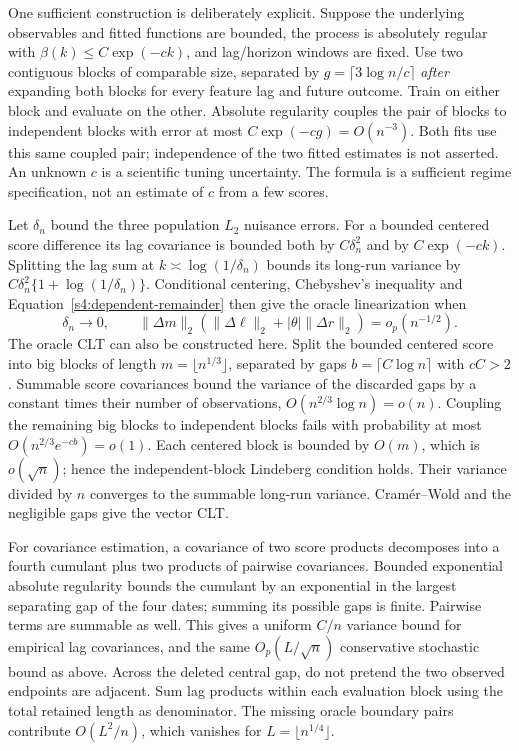 One sufficient construction is deliberately explicit. Suppose the underlying
observables and fitted functions are bounded, the process is absolutely
regular with $\beta(k)\le C\exp(-ck)$, and lag/horizon windows are fixed.
Use two contiguous blocks of comparable size, separated by
$g=\lceil3\log n/c\rceil$ \emph{after} expanding both blocks for every
feature lag and future outcome. Train on either block and evaluate on the
other. Absolute regularity couples the pair of blocks to independent
blocks with error at most $C\exp(-cg)=O(n^{-3})$. Both fits use this
same coupled pair; independence of the two fitted estimates is not asserted.
An unknown $c$ is a scientific tuning uncertainty. The formula is a
sufficient regime specification, not an estimate of $c$ from a few scores.

Let $\delta_n$ bound the three population $L_2$ nuisance errors. For a
bounded centered score difference its lag covariance is bounded both by
$C\delta_n^2$ and by $C\exp(-ck)$. Splitting the lag sum at
$k\asymp\log(1/\delta_n)$ bounds its long-run variance by
$C\delta_n^2\{1+\log(1/\delta_n)\}$. Conditional centering, Chebyshev's
inequality and Equation~\eqref{s4:dependent-remainder} then give the oracle
linearization when
\[
 \delta_n\to0,\qquad
 \|\Delta m\|_2(\|\Delta\ell\|_2+|\theta|\|\Delta r\|_2)
       =o_p(n^{-1/2}).
\]
The oracle CLT can also be constructed here. Split the bounded centered
score into big blocks of length $m=\lfloor n^{1/3}\rfloor$, separated
by gaps $b=\lceil C\log n\rceil$ with $cC>2$. Summable score
covariances bound the variance of the discarded gaps by a constant times
their number of observations, $O(n^{2/3}\log n)=o(n)$. Coupling the
remaining big blocks to independent blocks fails with probability at most
$O(n^{2/3}e^{-cb})=o(1)$. Each centered block is bounded by $O(m)$,
which is $o(\sqrt n)$; hence the independent-block Lindeberg condition
holds. Their variance divided by $n$ converges to the summable long-run
variance. Cram\'er--Wold and the negligible gaps give the vector CLT.

For covariance estimation, a covariance of two score products decomposes
into a fourth cumulant plus two products of pairwise covariances. Bounded
exponential absolute regularity bounds the cumulant by an exponential in
the largest separating gap of the four dates; summing its possible gaps
is finite. Pairwise terms are summable as well. This gives a uniform
$C/n$ variance bound for empirical lag covariances, and the same
$O_p(L/\sqrt n)$ conservative stochastic bound as above. Across the deleted central gap,
do not pretend the two observed endpoints are adjacent. Sum lag products
within each evaluation block using the total retained length as denominator.
The missing oracle boundary pairs contribute $O(L^2/n)$, which vanishes
for $L=\lfloor n^{1/4}\rfloor$.

